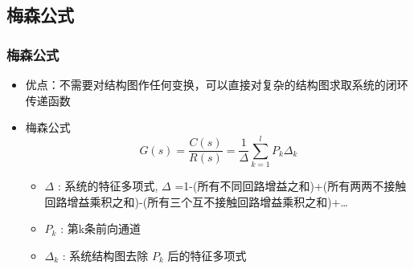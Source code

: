 \documentclass{article}
\begin{document}
\subsection{梅森公式}
\label{sec-3-4}
\begin{frame}
\frametitle{梅森公式}
\label{sec-3-4-1}

\begin{itemize}
\item <2-> 优点：不需要对结构图作任何变换，可以直接对复杂的结构图求取系统的闭环传递函数
\item <3-> 梅森公式 
       $$ G(s)=\frac{C(s)}{R(s)}=\frac{1}{\Delta}\sum_{k=1}^l P_k\Delta_k $$
\begin{itemize}
\item <4-> $\Delta$ : 系统的特征多项式, $\Delta$ =1-(所有不同回路增益之和)+(所有两两不接触回路增益乘积之和)-(所有三个互不接触回路增益乘积之和)+\ldots{}
\item <5-> $P_k$ : 第k条前向通道
\item <6-> $\Delta_k$ : 系统结构图去除 $P_k$ 后的特征多项式
\end{itemize}
\end{itemize}
\end{frame}
\end{document}
